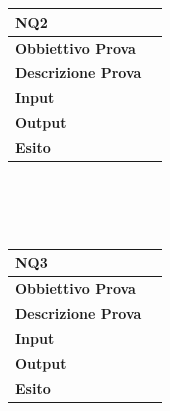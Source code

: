 \documentclass[11pt,titlepage,a4paper]{report}
\begin{document}
\\
\\
\begin{tabular}{||p{4.5cm}||p{7.5cm}||}
\hline
\textbf{\textsf{NQ2}}& \\
\hline
{\textbf {Obbiettivo Prova}}& \\ \hline
{\textbf{Descrizione Prova}}&  \\ \hline
{\textbf{Input}}&  \\ \hline
{\textbf{Output}}& \\ \hline
{\textbf{Esito}}&  \\ \hline
\end{tabular} \\
\\
\\
\begin{tabular}{||p{4.5cm}||p{7.5cm}||}
\hline
\textbf{\textsf{NQ3}}& \\
\hline
{\textbf {Obbiettivo Prova}}& \\ \hline
{\textbf{Descrizione Prova}}&  \\ \hline
{\textbf{Input}}&  \\ \hline
{\textbf{Output}}& \\ \hline
{\textbf{Esito}}&  \\ \hline
\end{tabular} \\
\end{document}

